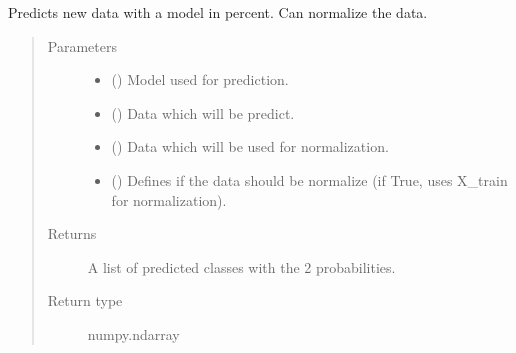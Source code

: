 \documentclass[letterpaper,10pt,english]{sphinxmanual}
\begin{document}

\begin{fulllineitems}
\label{\detokenize{anoog.model:anoog.model.model.predict_proba}}
\sphinxAtStartPar
Predicts new data with a model in percent.
Can normalize the data.
\begin{quote}\begin{description}
\item[{Parameters}] \leavevmode\begin{itemize}
\item {} 
\sphinxAtStartPar
{} () \textendash{} Model used for prediction.

\item {} 
\sphinxAtStartPar
{} () \textendash{} Data which will be predict.

\item {} 
\sphinxAtStartPar
{} () \textendash{} Data which will be used for normalization.

\item {} 
\sphinxAtStartPar
{} (\sphinxstyleliteralemphasis{\sphinxupquote{, }}) \textendash{} Defines if the data should be normalize (if True, uses X\_train for normalization).

\end{itemize}

\item[{Returns}] \leavevmode
\sphinxAtStartPar
A list of predicted classes with the 2 probabilities.

\item[{Return type}] \leavevmode
\sphinxAtStartPar
numpy.ndarray

\end{description}\end{quote}

\end{fulllineitems}
\end{document}
